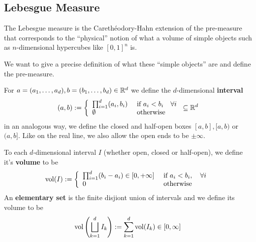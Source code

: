 \subsection{Lebesgue Measure}
The Lebesgue measure is the Carethéodory-Hahn extension of the pre-measure that corresponds to the ``physical'' notion of what a volume of simple objects such as $n$-dimensional hypercubes like $[0,1]^{n}$ is.

We want to give a precise definition of what these ``simple objects'' are and define the pre-measure.
\begin{dfn}[]
  For $a = (a_{1}, \ldots, a_{d}), b = (b_{1}, \ldots, b_{d}) \in \mathbb{R}^{d}$ we define the $d$-dimensional \textbf{interval}
  \begin{align*}
    (a,b)
    :=
    \left\{\begin{array}{ll}
        \prod_{i=1}^{d}(a_i,b_i) & \text{ if } a_i < b_i \quad \forall i\\
       \emptyset & \text{ otherwise}
    \end{array} \right.
    \subseteq \mathbb{R}^{d}
  \end{align*}
  in an analogous way, we define the closed and half-open boxes $[a,b], [a,b)$ or $(a,b]$.
  Like on the real line, we also allow the open ends to be $\pm \infty$.

  To each $d$-dimensional interval $I$ (whether open, closed or half-open), we define it's \textbf{volume} to be
  \begin{align*}
    \operatorname{vol}(I) :=
    \left\{\begin{array}{ll}
    \prod_{i=1}^{d}(b_i - a_i) \in [0,+\infty] 
       &
    \text{ if } a_i < b_i, \quad \forall i
       \\
      0 & \text{ otherwise}
    \end{array} \right.
  \end{align*}
  An \textbf{elementary set} is the finite disjiont union of intervals and we define its volume to be 
  \begin{align*}
    \operatorname{vol}\left(
      \bigsqcup_{k=1}^{d}I_k 
    \right)
      :=
      \sum_{k=1}^{d}\operatorname{vol}(I_k) \in [0,\infty]
  \end{align*}
\end{dfn}


